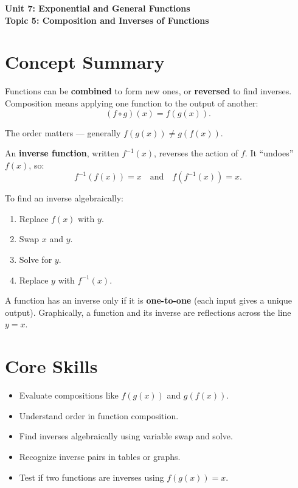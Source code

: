 \documentclass[14pt]{extarticle}
\begin{document}
\raggedright
{}

\begin{center}
    \LARGE \textbf{Unit 7: Exponential and General Functions} \\[6pt]
    \Large \textbf{Topic 5: Composition and Inverses of Functions}
\end{center}

\vspace{1em}

\section*{Concept Summary}

Functions can be \textbf{combined} to form new ones, or \textbf{reversed} to find inverses.  
Composition means applying one function to the output of another:
\[
(f \circ g)(x) = f(g(x)).
\]

The order matters — generally \(f(g(x)) \ne g(f(x))\).

An \textbf{inverse function}, written \(f^{-1}(x)\), reverses the action of \(f\).  
It “undoes” \(f(x)\), so:
\[
f^{-1}(f(x)) = x \quad \text{and} \quad f(f^{-1}(x)) = x.
\]

To find an inverse algebraically:
\begin{enumerate}
  \item Replace \(f(x)\) with \(y\).
  \item Swap \(x\) and \(y\).
  \item Solve for \(y\).
  \item Replace \(y\) with \(f^{-1}(x)\).
\end{enumerate}

A function has an inverse only if it is \textbf{one-to-one} (each input gives a unique output).  
Graphically, a function and its inverse are reflections across the line \(y = x\).

\section*{Core Skills}
\begin{itemize}
  \item Evaluate compositions like \(f(g(x))\) and \(g(f(x))\).
  \item Understand order in function composition.
  \item Find inverses algebraically using variable swap and solve.
  \item Recognize inverse pairs in tables or graphs.
  \item Test if two functions are inverses using \(f(g(x)) = x\).
\end{itemize}
\end{document}
